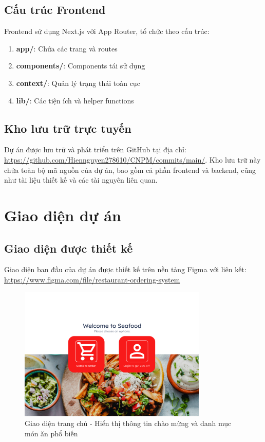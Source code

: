 \documentclass[a4paper]{article}
\begin{document}
\begin{itemize}
\subsection{Cấu trúc Frontend}

Frontend sử dụng Next.js với App Router, tổ chức theo cấu trúc:

\begin{enumerate}
    \item \textbf{app/}: Chứa các trang và routes
    \item \textbf{components/}: Components tái sử dụng
    \item \textbf{context/}: Quản lý trạng thái toàn cục
    \item \textbf{lib/}: Các tiện ích và helper functions
\end{enumerate}

\subsection{Kho lưu trữ trực tuyến}
Dự án được lưu trữ và phát triển trên GitHub tại địa chỉ: \url{https://github.com/Hiennguyen278610/CNPM/commits/main/}. 
Kho lưu trữ này chứa toàn bộ mã nguồn của dự án, bao gồm cả phần frontend và backend, cũng như tài liệu thiết kế và các tài nguyên liên quan.

\newpage

\section{Giao diện dự án}
    \subsection{Giao diện được thiết kế}
    
    Giao diện ban đầu của dự án được thiết kế trên nền tảng Figma với liên kết: \url{https://www.figma.com/file/restaurant-ordering-system}
    
    \begin{figure}[H]
        \centering
        \includegraphics[width=0.8\textwidth]{figmaHome.png}
        \caption{Giao diện trang chủ - Hiển thị thông tin chào mừng và danh mục món ăn phổ biến}
    \end{figure}
    

\end{itemize}
\end{document}
